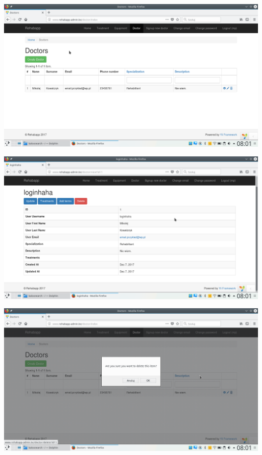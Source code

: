 \begin{itemize}
\vspace{0,5cm}
\includegraphics[scale=0.4]{obraz/14.png}
\vspace{0,5cm}

\vspace{0,5cm}
\includegraphics[scale=0.4]{obraz/15.png}
\vspace{0,5cm}

\vspace{0,5cm}
\includegraphics[scale=0.4]{obraz/16.png}
\vspace{0,5cm}
	


\end{itemize}
\newpage
